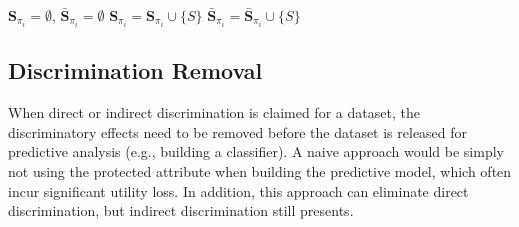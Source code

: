 \documentclass[letterpaper]{article}
\begin{document}
{
\setlength{\interspacetitleruled}{-.4pt}%
\begin{algorithm}
\SetAlgoVlined
\small
		$\mathbf{S}_{\pi_{i}} = \emptyset$, $\bar{\mathbf{S}}_{\pi_{i}} = \emptyset$\;
		 {
			 {
				 {
					$\mathbf{S}_{\pi_{i}} = \mathbf{S}_{\pi_{i}}\cup \{S\}$\;
				} {
					$\bar{\mathbf{S}}_{\pi_{i}} = \bar{\mathbf{S}}_{\pi_{i}}\cup \{S\}$\;
				}
			}
		}		
\end{algorithm}
}

\vspace{-0.4cm}

\subsection{Discrimination Removal}
When direct or indirect discrimination is claimed for a dataset, the discriminatory effects need to be removed before the dataset is released for predictive analysis (e.g., building a classifier). A naive approach would be simply not using the protected attribute when building the predictive model, which often incur significant utility loss. In addition, this approach can eliminate direct discrimination, but indirect discrimination still presents.
\end{document}
